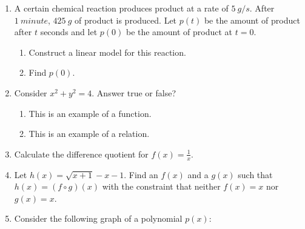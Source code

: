 \documentclass[letterpaper,12pt,fleqn]{article}
\begin{document}
\begin{enumerate}
\item A certain chemical reaction produces product at a rate of $\SI{5}{g/s}$.
  After $\SI{1}{minute}$, $\SI{425}{g}$ of product is produced. Let $p(t)$ be
  the amount of product after $t$ seconds and let $p(0)$ be the amount of
  product at $t=0$.
  \begin{enumerate}
  \item Construct a linear model for this reaction.

    \vspace{1in}
    
  \item Find $p(0)$.
  \end{enumerate}

  \vspace{2in}

\item Consider $x^2+y^2=4$. Answer true or false?
  \begin{enumerate}
  \item This is an example of a function.

    \bigskip
    
  \item This is an example of a relation.
  \end{enumerate}

  \bigskip

  \newpage

\item Calculate the difference quotient for $f(x)=\frac{1}{x}$.

  \vspace{3in}

\item Let $h(x)=\sqrt{x+1}-x-1$. Find an $f(x)$ and a $g(x)$ such that
  $h(x)=(f\circ g)(x)$ with the constraint that neither $f(x)=x$ nor
  $g(x)=x$.

  \newpage
  
\item Consider the following graph of a polynomial $p(x)$:



\end{enumerate}
\end{document}
